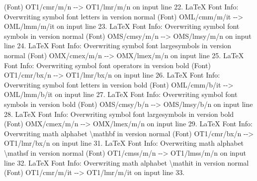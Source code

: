 \documentclass[
  letterpaper,
  DIV=11,
  numbers=noendperiod]{scrartcl}
\newenvironment{Shaded}{\begin{snugshade}}{\end{snugshade}}
\newcommand{\NormalTok}[1]{\textcolor[rgb]{0.00,0.23,0.31}{#1}}
\begin{document}
\begin{Shaded}
\begin{Highlighting}[]
\NormalTok{(Font)                  OT1/cmr/m/n {-}{-}\textgreater{} OT1/lmr/m/n on input line 22.}
\NormalTok{LaTeX Font Info:    Overwriting symbol font \textasciigrave{}letters\textquotesingle{} in version \textasciigrave{}normal\textquotesingle{}}
\NormalTok{(Font)                  OML/cmm/m/it {-}{-}\textgreater{} OML/lmm/m/it on input line 23.}
\NormalTok{LaTeX Font Info:    Overwriting symbol font \textasciigrave{}symbols\textquotesingle{} in version \textasciigrave{}normal\textquotesingle{}}
\NormalTok{(Font)                  OMS/cmsy/m/n {-}{-}\textgreater{} OMS/lmsy/m/n on input line 24.}
\NormalTok{LaTeX Font Info:    Overwriting symbol font \textasciigrave{}largesymbols\textquotesingle{} in version \textasciigrave{}normal\textquotesingle{}}
\NormalTok{(Font)                  OMX/cmex/m/n {-}{-}\textgreater{} OMX/lmex/m/n on input line 25.}
\NormalTok{LaTeX Font Info:    Overwriting symbol font \textasciigrave{}operators\textquotesingle{} in version \textasciigrave{}bold\textquotesingle{}}
\NormalTok{(Font)                  OT1/cmr/bx/n {-}{-}\textgreater{} OT1/lmr/bx/n on input line 26.}
\NormalTok{LaTeX Font Info:    Overwriting symbol font \textasciigrave{}letters\textquotesingle{} in version \textasciigrave{}bold\textquotesingle{}}
\NormalTok{(Font)                  OML/cmm/b/it {-}{-}\textgreater{} OML/lmm/b/it on input line 27.}
\NormalTok{LaTeX Font Info:    Overwriting symbol font \textasciigrave{}symbols\textquotesingle{} in version \textasciigrave{}bold\textquotesingle{}}
\NormalTok{(Font)                  OMS/cmsy/b/n {-}{-}\textgreater{} OMS/lmsy/b/n on input line 28.}
\NormalTok{LaTeX Font Info:    Overwriting symbol font \textasciigrave{}largesymbols\textquotesingle{} in version \textasciigrave{}bold\textquotesingle{}}
\NormalTok{(Font)                  OMX/cmex/m/n {-}{-}\textgreater{} OMX/lmex/m/n on input line 29.}
\NormalTok{LaTeX Font Info:    Overwriting math alphabet \textasciigrave{}\textbackslash{}mathbf\textquotesingle{} in version \textasciigrave{}normal\textquotesingle{}}
\NormalTok{(Font)                  OT1/cmr/bx/n {-}{-}\textgreater{} OT1/lmr/bx/n on input line 31.}
\NormalTok{LaTeX Font Info:    Overwriting math alphabet \textasciigrave{}\textbackslash{}mathsf\textquotesingle{} in version \textasciigrave{}normal\textquotesingle{}}
\NormalTok{(Font)                  OT1/cmss/m/n {-}{-}\textgreater{} OT1/lmss/m/n on input line 32.}
\NormalTok{LaTeX Font Info:    Overwriting math alphabet \textasciigrave{}\textbackslash{}mathit\textquotesingle{} in version \textasciigrave{}normal\textquotesingle{}}
\NormalTok{(Font)                  OT1/cmr/m/it {-}{-}\textgreater{} OT1/lmr/m/it on input line 33.}

\end{Highlighting}
\end{Shaded}
\end{document}
